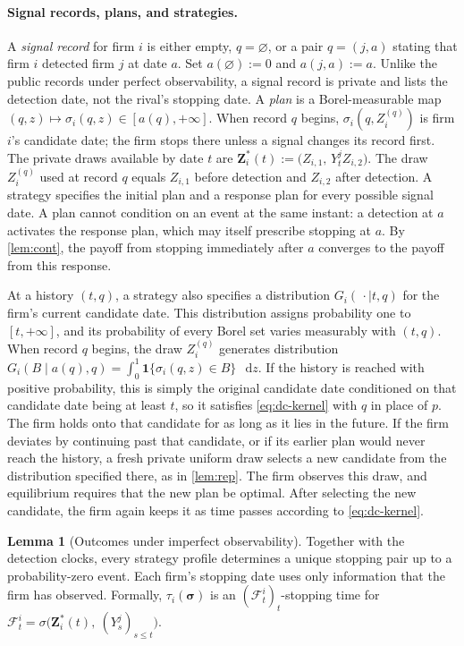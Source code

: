 \documentclass[12pt,reqno]{article}
\newcommand{\de}{\mathop{}\!\mathrm{d}}
\theoremstyle{definition} \newtheorem{example}{Example}
\theoremstyle{definition} \newtheorem{condition}{Condition}
\theoremstyle{definition} \newtheorem{corollary}{Corollary}
\theoremstyle{definition} \newtheorem{claim}{Claim}
\theoremstyle{definition} \newtheorem{definition}{Definition}
\theoremstyle{definition} \newtheorem{conjecture}{Conjecture}
\theoremstyle{definition} \newtheorem{Lemma}{Lemma}
\theoremstyle{definition} \newtheorem{lemma}{Lemma}
\theoremstyle{plain} \newtheorem{theorem}{Theorem}
\theoremstyle{definition} \newtheorem{assumption}{Assumption}
\theoremstyle{definition} \newtheorem*{assumptionnonumber}{Assumption}
\theoremstyle{definition} \newtheorem*{theoremNoNumber}{Proposition}
\theoremstyle{definition}
\theoremstyle{definition}\newtheorem{proposition}{Proposition}
\theoremstyle{definition} \newtheorem{result}{Result}
\theoremstyle{definition} \newtheorem*{definitionNoNumber}{Definition}
\theoremstyle{definition} \newtheorem{Definition}{Definition}
\theoremstyle{definition} \newtheorem*{DefinitionNoNumber}{Definition}
\theoremstyle{definition} \newtheorem*{fact}{Fact}
\theoremstyle{definition} \newtheorem*{property}{Property}
\theoremstyle{definition} \newtheorem{remark}{Remark}
\begin{document}
\paragraph{Signal records, plans, and strategies.}
A \emph{signal record} for firm $i$ is either empty, $q=\varnothing$, or a pair $q=(j,a)$ stating that firm $i$ detected firm $j$ at date $a$. Set $a(\varnothing):=0$ and $a(j,a):=a$. Unlike the public records under perfect observability, a signal record is private and lists the detection date, not the rival's stopping date. A \emph{plan} is a Borel-measurable map $(q,z)\mapsto\sigma_i(q,z)\in[a(q),+\infty]$. When record $q$ begins, $\sigma_i(q,Z_i^{(q)})$ is firm $i$'s candidate date; the firm stops there unless a signal changes its record first. The private draws available by date $t$ are
$
\bm Z_i^\ast(t):=\bigl(Z_{i,1},\,Y^j_tZ_{i,2}\bigr).$ The draw $Z_i^{(q)}$ used at record $q$ equals $Z_{i,1}$ before detection and $Z_{i,2}$ after detection. A strategy specifies the initial plan and a response plan for every possible signal date. A plan cannot condition on an event at the same instant: a detection at $a$ activates the response plan, which may itself prescribe stopping at $a$. By \cref{lem:cont}, the payoff from stopping immediately after $a$ converges to the payoff from this response.

At a history $(t,q)$, a strategy also specifies a distribution $G_i(\,\cdot\mid t,q)$ for the firm's current candidate date. This distribution assigns probability one to $[t,+\infty]$, and its probability of every Borel set varies measurably with $(t,q)$. When record $q$ begins, the draw $Z_i^{(q)}$ generates distribution $G_i(B\mid a(q),q)
=\int_0^1\mathbf 1\{\sigma_i(q,z)\in B\}\,\de z .$  If the history is reached with positive probability, this is simply the original candidate date conditioned on that candidate date being at least $t$, so it satisfies \eqref{eq:dc-kernel} with 
$q$ in place of $p$. The firm holds onto that candidate for as long as it lies in the future.  If the firm deviates by continuing past that candidate, or if its earlier plan would never reach the history, a fresh private uniform draw selects a new candidate from the distribution specified there, as in \cref{lem:rep}. The firm observes this draw, and equilibrium requires that the new plan be optimal. After selecting the new candidate, the firm again keeps it as time passes according to \eqref{eq:dc-kernel}.

\begin{lemma}[Outcomes under imperfect observability]\label{lem:outcome-noisy}
Together with the detection clocks, every strategy profile determines a unique stopping pair up to a probability-zero event. Each firm's stopping date uses only information that the firm has observed. Formally, $\tau_i(\bm\sigma)$ is an $(\mathcal F^i_t)_t$-stopping time for
$
\mathcal F^i_t=\sigma\big(\bm Z_i^\ast(t),\ (Y^j_s)_{s\le t}\big).
$\end{lemma}
\end{document}
